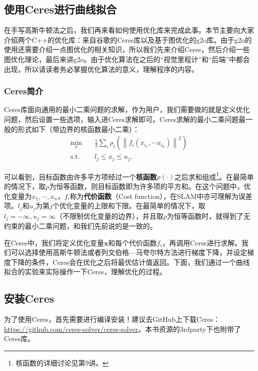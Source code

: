 

\subsection{使用Ceres进行曲线拟合}
在手写高斯牛顿法之后，我们再来看如何使用优化库来完成此事。本节主要向大家介绍两个C++的优化库：来自谷歌的Ceres库\textsuperscript{\cite{Ceres}}以及基于图优化的g2o库\textsuperscript{\cite{Kummerle2011}}。由于g2o的使用还需要介绍一点图优化的相关知识，所以我们先来介绍Ceres，然后介绍一些图优化理论，最后来讲g2o。由于优化算法在之后的“视觉里程计”和“后端”中都会出现，所以请读者务必掌握优化算法的意义，理解程序的内容。

\subsubsection{Ceres简介}
Ceres库面向通用的最小二乘问题的求解，作为用户，我们需要做的就是定义优化问题，然后设置一些选项，输入进Ceres求解即可。Ceres求解的最小二乘问题最一般的形式如下（带边界的核函数最小二乘）：
\begin{equation}
\begin{array}{ll}
\min \limits_x \quad & \frac{1}{2}\sum\limits_i {{\rho _i}\left( {{{\left\| {{f_i}\left( {{x_{{i_1}}}, \cdots {x_{{i_n}}}} \right)} \right\|}^2}} \right)} \\
\mathrm{s.t.} \quad & {l_j} \leqslant {x_j} \leqslant {u_j}.
\end{array}
\end{equation}

可以看到，目标函数由许多平方项经过一个\textbf{核函数}$\rho(\cdot)$之后求和组成\footnote{核函数的详细讨论见第9讲。}。在最简单的情况下，取$\rho$为恒等函数，则目标函数即为许多项的平方和。在这个问题中，优化变量为$x_1, \cdots, x_n$，$f_i$称为\textbf{代价函数}（Cost function），在SLAM中亦可理解为误差项。$l_j$和$u_j$为第$j$个优化变量的上限和下限。在最简单的情况下，取$l_j = -\infty, u_j=\infty$（不限制优化变量的边界），并且取$\rho$为恒等函数时，就得到了无约束的最小二乘问题，和我们先前说的是一致的。

在Ceres中，我们将定义优化变量$\bm{x}$和每个代价函数$f_i$，再调用Ceres进行求解。我们可以选择使用高斯牛顿法或者列文伯格—马夸尔特方法进行梯度下降，并设定梯度下降的条件，Ceres会在优化之后将最优估计值返回。下面，我们通过一个曲线拟合的实验来实际操作一下Ceres，理解优化的过程。

\subsection{安装Ceres}
为了使用Ceres，首先需要进行编译安装！建议去GitHub上下载Ceres：\url{https://github.com/ceres-solver/ceres-solver}。本书资源的3rdparty下也附带了Ceres库。


